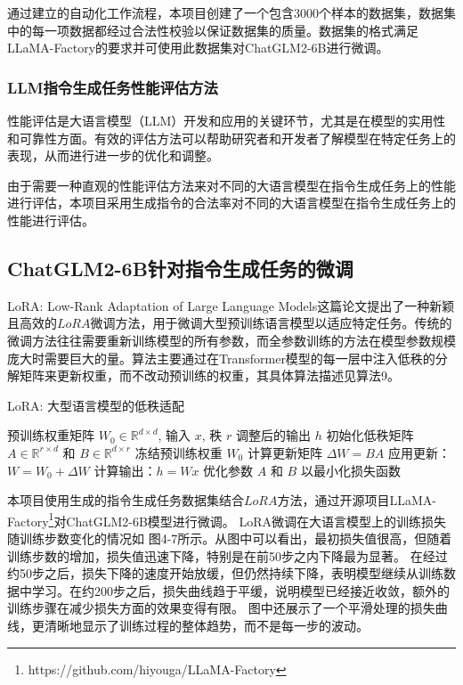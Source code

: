 \documentclass[a4paper,AutoFakeBold,oneside,12pt]{book}
\begin{document}
通过建立的自动化工作流程，本项目创建了一个包含3000个样本的数据集，数据集中的每一项数据都经过合法性校验以保证数据集的质量。数据集的格式满足LLaMA-Factory的要求并可使用此数据集对ChatGLM2-6B进行微调。
\subsubsection{LLM指令生成任务性能评估方法}
性能评估是大语言模型（LLM）开发和应用的关键环节，尤其是在模型的实用性和可靠性方面。有效的评估方法可以帮助研究者和开发者了解模型在特定任务上的表现，从而进行进一步的优化和调整。

由于需要一种直观的性能评估方法来对不同的大语言模型在指令生成任务上的性能进行评估，本项目采用生成指令的合法率对不同的大语言模型在指令生成任务上的性能进行评估。


\subsection{ChatGLM2-6B针对指令生成任务的微调}
LoRA: Low-Rank Adaptation of Large Language Models\cite{hu2021lora}这篇论文提出了一种新颖且高效的$LoRA$微调方法，用于微调大型预训练语言模型以适应特定任务。传统的微调方法往往需要重新训练模型的所有参数，而全参数训练的方法在模型参数规模庞大时需要巨大的量。算法主要通过在Transformer模型的每一层中注入低秩的分解矩阵来更新权重，而不改动预训练的权重，其具体算法描述见算法9。
\begin{algorithm}
	\begin{spacing}{1.3}
		\caption{LoRA: 大型语言模型的低秩适配} 
		\label{LoRA_model}
		\renewcommand{\algorithmicrequire}{\textbf{输入：}}
		\renewcommand{\algorithmicensure}{\textbf{输出：}} 
			\begin{algorithmic}[1] 
				\Require 预训练权重矩阵 $W_0 \in \mathbb{R}^{d \times d}$, 输入 $x$, 秩 $r$
				\Ensure 调整后的输出 $h$
				\State 初始化低秩矩阵 $A \in \mathbb{R}^{r \times d}$ 和 $B \in \mathbb{R}^{d \times r}$
				\State 冻结预训练权重 $W_0$
				    \State 计算更新矩阵 $\Delta W = BA$
				    \State 应用更新：$W = W_0 + \Delta W$
				    \State 计算输出：$h = Wx$
				\EndFor
				\State 优化参数 $A$ 和 $B$ 以最小化损失函数
			\end{algorithmic}
	\end{spacing}
\end{algorithm}


本项目使用生成的指令生成任务数据集结合$LoRA$方法，通过开源项目LLaMA-Factory\footnote{https://github.com/hiyouga/LLaMA-Factory}对ChatGLM2-6B模型进行微调。
LoRA微调在大语言模型上的训练损失随训练步数变化的情况如 图4-7所示。从图中可以看出，最初损失值很高，但随着训练步数的增加，损失值迅速下降，特别是在前50步之内下降最为显著。
在经过约50步之后，损失下降的速度开始放缓，但仍然持续下降，表明模型继续从训练数据中学习。在约200步之后，损失曲线趋于平缓，说明模型已经接近收敛，额外的训练步骤在减少损失方面的效果变得有限。
图中还展示了一个平滑处理的损失曲线，更清晰地显示了训练过程的整体趋势，而不是每一步的波动。
\end{document}

